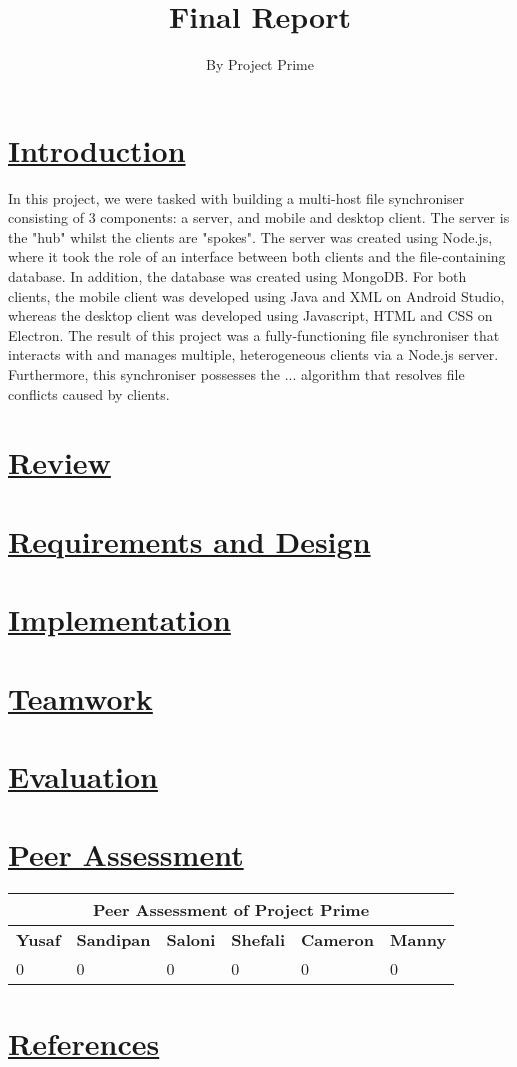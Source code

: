 \documentclass{article}
\title{Final Report}
\author{By Project Prime}
\begin{document}
   \maketitle
 	\section{\underline{Introduction}}
	In this project, we were tasked with building a multi-host file synchroniser consisting of 3 components: a server, and mobile and desktop client. The server is the "hub" whilst the clients are "spokes". The server was created using Node.js, where it took the role of an interface between both clients and the file-containing database. In addition, the database was created using MongoDB. For both clients, the mobile client was developed using Java and XML on Android Studio, whereas the desktop client was developed using Javascript, HTML and CSS on Electron. The result of this project was a fully-functioning file synchroniser that interacts with and manages multiple, heterogeneous clients via a Node.js server. Furthermore, this synchroniser possesses the ... algorithm that resolves file conflicts caused by clients. 

	\section{\underline{Review}}

	\section{\underline{Requirements and Design}}

	\section{\underline{Implementation}}
	
	\section{\underline{Teamwork}}

	\section{\underline{Evaluation}}

	\section{\underline{Peer Assessment}}
	\begin{tabular}{|p{2cm}|p{2cm}|p{2cm}|p{2cm}|p{2cm}|p{2cm}|}
	\hline
	\multicolumn{6}{|c|}{\textbf{Peer Assessment of Project Prime}} \\
	\hline
	\textbf{Yusaf} & \textbf{Sandipan} & \textbf{Saloni} & \textbf{Shefali} & \textbf{Cameron} & \textbf{Manny} \\
	\hline
	0 & 0 & 0 & 0 & 0 & 0 \\
	\hline
	\end{tabular}
	\section{\underline{References}}
\end{document}
